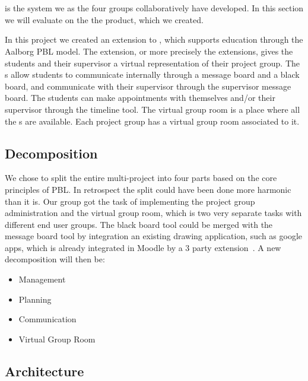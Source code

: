 \section{\system{}}
\system{} is the system we as the four groups collaboratively have developed.
In this section we will evaluate on the the product, which we created.


In this project we created an extension to \moodle{}, which supports education through the Aalborg PBL model. 
The extension, or more precisely the extensions, gives the students and their supervisor a virtual representation of their project group. 
The \detdeandrelaver{}s allow students to communicate internally through a message board and a black board, and communicate with their supervisor through the supervisor message board.
The students can make appointments with themselves and/or their supervisor through the timeline tool.
The virtual group room is a place where all the \detdeandrelaver{}s are available.
Each project group has a virtual group room associated to it.


\subsection{Decomposition}
We chose to split the entire multi-project into four parts based on the core principles of PBL. 
In retrospect the split could have been done more harmonic than it is.
Our group got the task of implementing the project group administration and the virtual group room, which is two very separate tasks with different end user groups. 
The black board tool could be merged with the message board tool by integration an existing drawing application, such as google apps, which is already integrated in Moodle by a 3\rd{} party extension~\cite{moodlegoogleapp}. 
A new decomposition will then be:
\begin{itemize}
	\item Management
	\item Planning
	\item Communication
	\item Virtual Group Room
\end{itemize}



\subsection{Architecture}



